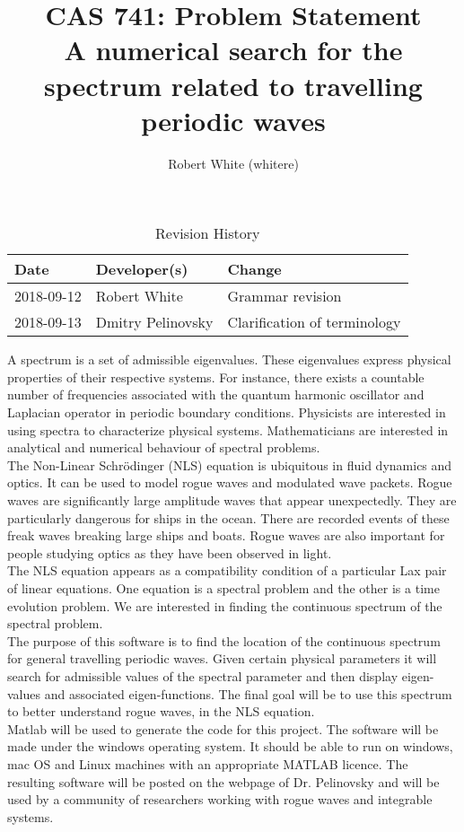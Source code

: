\documentclass{article}
\title{CAS 741: Problem Statement\\A numerical search for the spectrum related to travelling periodic waves}
\author{Robert White (whitere)}
\date{}
\begin{document}
\maketitle
\begin{table}[hp]
\caption{Revision History} \label{TblRevisionHistory}
\begin{tabularx}{\textwidth}{llX}
\toprule
\textbf{Date} & \textbf{Developer(s)} & \textbf{Change}\\
\midrule
2018-09-12 & Robert White & Grammar revision \\
2018-09-13 & Dmitry Pelinovsky & Clarification of terminology\\
\bottomrule
\end{tabularx}
\end{table}

A spectrum is a set of admissible eigenvalues. These eigenvalues express physical properties of their respective systems. For instance, there exists a countable number of frequencies associated with the quantum harmonic oscillator and Laplacian operator in periodic boundary conditions. Physicists are interested in using spectra to characterize physical systems. Mathematicians are interested in analytical and numerical behaviour of spectral problems.\\

The Non-Linear Schr\"{o}dinger (NLS) equation is ubiquitous in fluid dynamics and optics. It can be used to model rogue waves and modulated wave packets. Rogue waves are significantly large amplitude waves that appear unexpectedly. They are particularly dangerous for ships in the ocean. There are recorded events of these freak waves breaking large ships and boats. Rogue waves are also important for people studying optics as they have been observed in light. \\

The NLS equation appears as a compatibility condition of a particular Lax pair of linear equations. One equation is a spectral problem and the other is a time evolution problem. We are interested in finding the continuous spectrum of the spectral problem. \\

The purpose of this software is to find the location of the continuous spectrum for general travelling periodic waves. Given certain physical parameters it will search for admissible values of the spectral parameter and then display eigen-values and associated eigen-functions. The final goal will be to use this spectrum to better understand rogue waves, in the NLS equation.  \\ 

Matlab will be used to generate the code for this project. The software will be made under the windows operating system. It should be able to run on windows, mac OS and Linux machines with an appropriate MATLAB licence. The resulting software will be posted on the webpage of Dr. Pelinovsky and will be used by a community of researchers working with rogue waves and integrable systems. 

\end{document}
